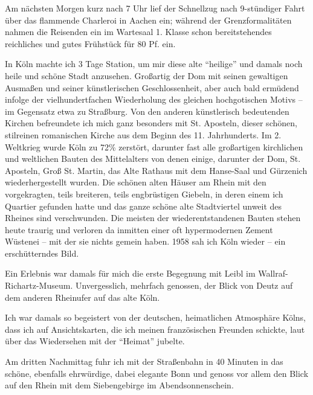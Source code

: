 \documentclass[a5paper,pagesize,10pt,twoside=true]{scrbook}
\begin{document}
Am nächsten Morgen kurz nach 7 Uhr lief der Schnellzug nach 9-stündiger Fahrt über das flammende Charleroi in Aachen ein; während der Grenzformalitäten nahmen die Reisenden ein im Wartesaal 1. Klasse schon bereitstehendes reichliches und gutes Frühstück für 80 Pf. ein.

In Köln machte ich 3 Tage Station, um mir diese alte \enquote{heilige} und damals noch heile und schöne Stadt anzusehen. Großartig der Dom mit seinen gewaltigen Ausmaßen und seiner künstlerischen Geschlossenheit, aber auch bald ermüdend infolge der vielhundertfachen Wiederholung des gleichen hochgotischen Motivs -- im Gegensatz etwa zu Straßburg. Von den anderen künstlerisch bedeutenden Kirchen befreundete ich mich ganz besonders mit St. Aposteln, dieser schönen, stilreinen romanischen Kirche aus dem Beginn des 11. Jahrhunderts. Im 2. Weltkrieg wurde Köln zu 72\% zerstört, darunter fast alle großartigen kirchlichen und weltlichen Bauten des Mittelalters von denen einige, darunter der Dom, St. Aposteln, Groß St. Martin, das Alte Rathaus mit dem Hanse-Saal und Gürzenich wiederhergestellt wurden. Die schönen alten Häuser am Rhein mit den vorgekragten, teils breiteren, teils engbrüstigen Giebeln, in deren einem ich Quartier gefunden hatte und das ganze schöne alte Stadtviertel unweit des Rheines sind verschwunden. Die meisten der wiederentstandenen Bauten stehen heute traurig und verloren da inmitten einer oft hypermodernen Zement Wüstenei -- mit der sie nichts gemein haben. 1958 sah ich Köln wieder -- ein erschütterndes Bild.

Ein Erlebnis war damals für mich die erste Begegnung mit Leibl im Wallraf-Richartz-Museum. Unvergesslich, mehrfach genossen, der Blick von Deutz auf dem anderen Rheinufer auf das alte Köln.

Ich war damals so begeistert von der deutschen, heimatlichen Atmosphäre Kölns, dass ich auf Ansichtskarten, die ich meinen französischen Freunden schickte, laut über das Wiedersehen mit der \enquote{Heimat} jubelte.

Am dritten Nachmittag fuhr ich mit der Straßenbahn in 40 Minuten in das schöne, ebenfalls ehrwürdige, dabei elegante Bonn und genoss vor allem den Blick auf den Rhein mit dem Siebengebirge im Abendsonnenschein.
\end{document}
